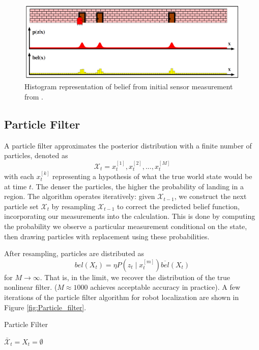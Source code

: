 \documentclass[twoside]{article}
\begin{document}
\begin{figure}[t]
\centering
\includegraphics[width=1\linewidth]{histogram_belief.png}
\caption{Histogram representation of belief from initial sensor measurement from \cite{thrun2005probabilistic}.}
\label{fig:Histogram_belief}
\end{figure}


\subsection{Particle Filter}

A particle filter approximates the posterior distribution with a finite number of particles, denoted as
\begin{equation}
	\mathcal{X}_t = x_t^{[1]}, x_t^{[2]},..., x_t^{[M]}
\end{equation}
with each $x_t^{[k]}$ representing a hypothesis of what the true world state would be at time $t$. The denser the particles, the higher the probability of landing in a region. The algorithm operates iteratively: given $\mathcal{X}_{t-1}$, we construct the next particle set $\mathcal{X}_t$ by resampling $\mathcal{X}_{t-1}$ to correct the predicted belief function, incorporating our measurements into the calculation. This is done by computing the probability we observe a particular measurement conditional on the state, then drawing particles with replacement using these probabilities.

After resampling, particles are distributed as
\begin{equation}
	bel(X_t) = \eta P(z_t \mid x_t^{[m]})\overline{bel}(X_t)
\end{equation}
for $M \rightarrow \infty$. That is, in the limit, we recover the distribution of the true nonlinear filter. ($M \approx 1000$ achieves acceptable accuracy in practice). A few iterations of the particle filter algorithm for robot localization are shown in Figure \ref{fig:Particle_filter}.

\begin{algorithm}[H]
\caption{Particle Filter}
$\bar{\mathcal{X}}_t = X_t = \emptyset$\;
\end{algorithm}
\end{document}
